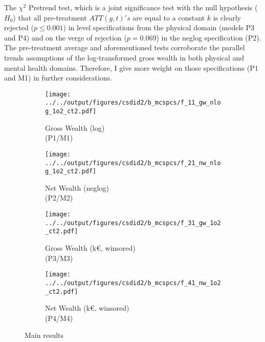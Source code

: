 The $\chi^2$ Pretrend test, which is a joint significance test with the null hypothesis ($H_0$) that all
pre-treatment $ATT(g,t)'s$ are equal to a constant $k$ is clearly rejected ($p \leq 0.001$) in level
specifications from the physical domain (models P3 and P4) and on the verge of rejection ($p = 0.069$) in the
neglog specification (P2). The pre-treatment average and aforementioned tests corroborate the parallel trends
assumptions of the log-transformed gross wealth in both physical and mental health domains. Therefore, I 
give more weight on those specifications (P1 and M1) in further considerations.

\begin{figure}[tb!] %
    \centering
    \begin{subfigure}{0.45\textwidth}
        \caption{Gross Wealth (log)\\(P1/M1)}
        \texttt{[image: ../../output/figures/csdid2/b\_mcspcs/f\_11\_gw\_nlog\_1o2\_ct2.pdf]}
        \label{sfig:did_gw_nlog}
    \end{subfigure}
    \begin{subfigure}{0.45\textwidth}
        \caption{Net Wealth (neglog)\\(P2/M2)}
        \texttt{[image: ../../output/figures/csdid2/b\_mcspcs/f\_21\_nw\_nlog\_1o2\_ct2.pdf]}
        \label{sfig:did_nw_nlog}
    \end{subfigure}
    \begin{subfigure}{0.45\textwidth}
        \caption{Gross Wealth (k€, winsored)\\(P3/M3)}
        \texttt{[image: ../../output/figures/csdid2/b\_mcspcs/f\_31\_gw\_1o2\_ct2.pdf]}
        \label{sfig:did_gw}
    \end{subfigure}
    \begin{subfigure}{0.45\textwidth}
        \caption{Net Wealth (k€, winsored)\\(P4/M4)}
        \texttt{[image: ../../output/figures/csdid2/b\_mcspcs/f\_41\_nw\_1o2\_ct2.pdf]}
        \label{sfig:did_nw}
    \end{subfigure}
    \caption{Main results} 
    \label{fig:maindid} 
\end{figure}

